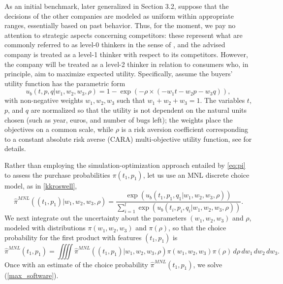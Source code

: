\documentclass[a4paper,fleqn, 11pt]{cas-sc}
\begin{document}
  As an initial benchmark, later generalized in Section 3.2, suppose that the decisions of the other companies are modeled as uniform within appropriate ranges, 
 essentially based on past behavior. Thus, for the moment,
  we pay no attention to strategic aspects concerning 
   competitors: these represent what are commonly referred to as level-0 thinkers in the sense of \cite{stahl},  %
    and the advised company is treated as a level-1 thinker 
 with respect to its competitors. 
  However, the company will be treated as a level-2 thinker in relation to  consumers who, in principle, aim to maximize expected utility. Specifically, assume the buyers' utility function has the parametric form 
\begin{equation}
    u_b(t,p,q | w_1, w_2, w_3, \rho )= 1-\exp (-\rho \times 
 (- w_1 t - w_2 p - w_3 q ) ),
 \label{eq:utility}
\end{equation}
with non-negative weights $w_1, w_2, w_3$ such that $w_1 + w_2 + w_3=1$.  
 The variables $t$, $p$, and $q$ are normalized so that the utility is not dependent on the 
  natural units chosen (such as year, euros, and number of bugs left); the weights place the objectives on a common scale, while $\rho$ is a risk aversion coefficient corresponding to a constant absolute risk averse (CARA) multi-objective utility function, see  \cite{gonzalez2018utility} for details.
  
  Rather than employing the simulation-optimization approach entailed by 
  \eqref{eq:pi} to assess the purchase probabilities
  $\pi(t_1,p_1)$, let us use an MNL discrete choice model,
    as in \eqref{kkroswell},%
\begin{equation*}
    \widehat{\pi }^{MNL}( (t_1, p_1) |w_1,w_2,w_3, \rho) = \frac{\exp{ ( u_b(t_1,p_1,q_1  | w_1, w_2, w_3 , \rho) )      }}{\sum_{i =1}^l \exp{  ( u_b(t_i  ,p_i  ,q_i   | w_1, w_2, w_3, \rho )  )            }}.
\end{equation*}
We next integrate out the uncertainty about
the parameters $(w_1,w_2,w_3) $ and $\rho$, modeled with distributions $\pi(w_1, w_2, w_3)$ and $\pi(\rho)$, 
so that the choice probability for the first product 
with features $(t_1,p_1)$ is 
\begin{equation*}
    \widehat{\pi }^{MNL} (t_1,p_1)  =  \iiiint \widehat{\pi }^{MNL} ((t_1,p_1) |w_1,w_2,w_3, \rho ) \pi (w_1,w_2,w_3) \pi (\rho )
   \,d\rho \,d w_1 \,d w_2 \,d w_3.
\end{equation*}
Once with an estimate of the choice probability $\widehat{\pi }^{MNL} (t_1,p_1)$,
we solve (\ref{max_software}).
\end{document}
